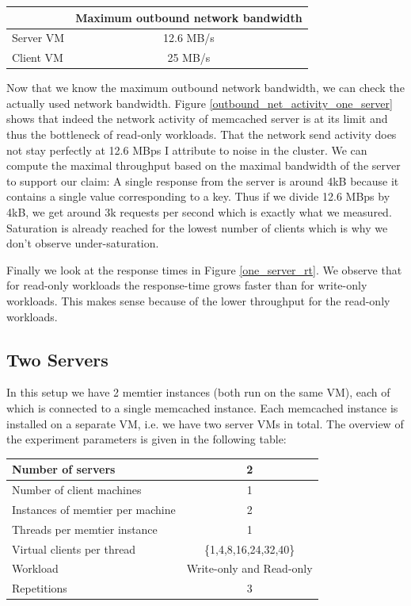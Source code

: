 \begin{center}
	\begin{tabular}{|l|c|}
	    \hline    & Maximum outbound network bandwidth          \\
		\hline Server VM  & 12.6 MB/s           \\ 
		\hline Client VM & 25 MB/s           \\ 
		\hline 
	\end{tabular}
\end{center}

Now that we know the maximum outbound network bandwidth, we can check the actually used network bandwidth. Figure \ref{outbound_net_activity_one_server} shows that indeed the network activity of memcached server is at its limit and thus the bottleneck of read-only workloads. That the network send activity does not stay perfectly at 12.6 MBps I attribute to noise in the cluster. We can compute the maximal throughput based on the maximal bandwidth of the server to support our claim: A single response from the server is around 4kB because it contains a single value corresponding to a key. Thus if we divide 12.6 MBps by 4kB, we get around 3k requests per second which is exactly what we measured. Saturation is already reached for the lowest number of clients which is why we don't observe under-saturation. 

Finally we look at the response times in Figure \ref{one_server_rt}. We observe that for read-only workloads the response-time grows faster than for write-only workloads. This makes sense because of the lower throughput for the read-only workloads. \\

\subsection{Two Servers}

In this setup we have 2 memtier instances (both run on the same VM), each of which is connected to a single memcached instance. Each memcached instance is installed on a separate VM, i.e. we have two server VMs in total. The overview of the experiment parameters is given in the following table: 
\begin{center}
	\scriptsize{
		\begin{tabular}{|l|c|}
			\hline Number of servers                & 2                        \\ 
			\hline Number of client machines        & 1                        \\ 
			\hline Instances of memtier per machine & 2                        \\ 
			\hline Threads per memtier instance     & 1                        \\
			\hline Virtual clients per thread       & \{1,4,8,16,24,32,40\}        \\ 
			\hline Workload                         & Write-only and Read-only \\
			\hline Repetitions                      & 3              \\ 
			\hline 
		\end{tabular}
	} 
\end{center}

